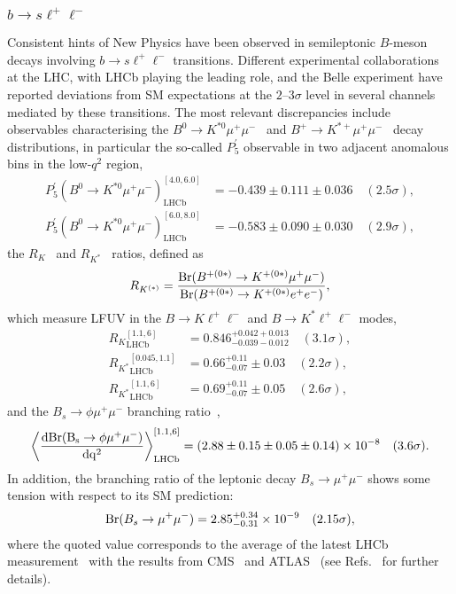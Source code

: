 \documentclass[10pt]{article}
\begin{document}
\subsubsection[$b\to s\ell^+\ell^-$]{\boldmath $b\to s\ell^+\ell^-$}
%
Consistent hints of New Physics have been observed in semileptonic $B$-meson decays involving $b\to s\ell^+\ell^-$ transitions. Different experimental collaborations at the LHC, with LHCb playing the leading role, and the Belle experiment have reported deviations from SM expectations at the $2$--$3\sigma$ level in several channels mediated by these transitions. The most relevant discrepancies include observables characterising the $B^0\to K^{*0}\mu^+\mu^-$~\cite{LHCb:2020lmf} and $B^+\to K^{*+}\mu^+\mu^-$~\cite{LHCb:2020gog} decay distributions, in particular the so-called $P_5^\prime$ observable in two adjacent anomalous bins in the low-$q^2$ region,
%
\begin{align}
P_5^\prime(B^0\to K^{*0}\mu^+\mu^-)^{[4.0, 6.0]}_\text{LHCb} &= -0.439 \pm 0.111 \pm 0.036 \quad (2.5\sigma),\\
P_5^\prime(B^0\to K^{*0}\mu^+\mu^-)^{[6.0, 8.0]}_\text{LHCb} &= -0.583 \pm 0.090 \pm 0.030 \quad (2.9\sigma),
\end{align}
%
the $R_K$~\cite{LHCb:2021trn} and $R_{K^*}$~\cite{Aaij:2017vbb} ratios, defined as~\cite{Hiller:2003js}
%
\begin{equation}
R_{K^{(*)}} = \frac{{\rm Br}(B^{+(0*)} \to K^{+(0*)} \mu^+ \mu^-)}{{\rm Br}(B^{+(0*)} \to K^{+(0*)} e^+ e^-)},
\end{equation}
%
which measure LFUV in the $B\to K\ell^+\ell^-$ and $B\to K^*\ell^+\ell^-$ modes,
%
\begin{align}
{R_K}^{[1.1,6]}_\text{LHCb} &= 0.846^{+0.042+0.013}_{-0.039-0.012} \quad (3.1\sigma),\\
{R_{K^*}}^{[0.045,1.1]}_\text{LHCb} &= 0.66^{+0.11}_{-0.07} \pm 0.03 \quad (2.2\sigma),\\
{R_{K^*}}^{[1.1,6]}_\text{LHCb} &= 0.69^{+0.11}_{-0.07} \pm 0.05 \quad (2.6\sigma),
\end{align}
%
and the $B_s \to \phi \mu^+ \mu^-$ branching ratio~\cite{Aaij:2015esa,LHCb:2021zwz},
%
\begin{equation}
{\rm \left\langle \frac{dBr(B_s \to \phi \mu^+ \mu^-)}{dq^2} \right\rangle}^{[1.1,6]}_\text{LHCb}= (2.88 \pm 0.15 \pm 0.05 \pm 0.14) \times 10^{-8} \quad (3.6\sigma).
\end{equation}
%
In addition, the branching ratio of the leptonic decay $B_s\to\mu^+\mu^-$ shows some tension with respect to its SM prediction:
%
\begin{equation}
{\rm Br}(B_s\to\mu^+\mu^-)=2.85^{+0.34}_{-0.31}\times 10^{-9} \quad (2.15\sigma),
\end{equation}
%
where the quoted value corresponds to the average of the latest LHCb measurement~\cite{LHCb:2021awg,LHCb:2021vsc} with the results from CMS~\cite{CMS:2019bbr} and ATLAS~\cite{Aaboud:2018mst} (see Refs.~\cite{Alguero:2021anc,Altmannshofer:2021qrr,Hurth:2021nsi,Geng:2021nhg} for further details).
\end{document}
